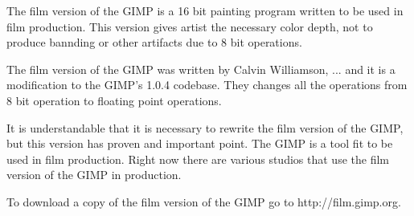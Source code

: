 The film version of the GIMP is a 16 bit painting program written to be used in film production. This version gives artist the necessary color depth, not to produce bannding or other artifacts due to 8 bit operations.  

The film version of the GIMP was written by Calvin Williamson, ... and it is a modification to the GIMP's 1.0.4 codebase. They changes all the operations from 8 bit operation to floating point operations. 

It is understandable that it is necessary to rewrite the film version of the GIMP, but this version has proven and important point. The GIMP is a tool fit to be used in film production. Right now there are various studios that use the film version of the GIMP in production. 

To download a copy of the film version of the GIMP go to http://film.gimp.org.


